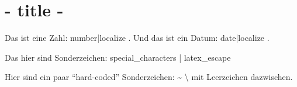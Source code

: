 \documentclass{article}
\begin{document}
\section{ {{- title -}} }


Das ist eine Zahl: {{ number|localize }}. Und das ist ein Datum: {{ date|localize }}.

Das hier sind Sonderzeichen: {{ special_characters | latex_escape }}

Hier sind ein paar ``hard-coded'' Sonderzeichen: \textasciitilde{}
\textbackslash{} mit Leerzeichen dazwischen.
\end{document}
